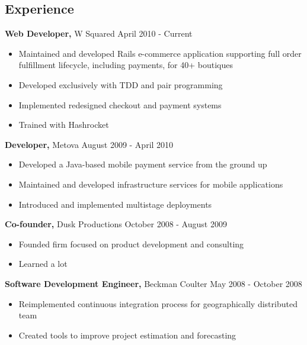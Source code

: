 \documentclass[line, margin, 10pt]{res}
\begin{document}
 

\renewcommand{\namefont}{ \LARGE \bf }

\address{elizabrock@gmail.com}
\address{(858) 205-9285}
 
\begin{resume} 
\section{Experience}
 {\bf Web Developer,} W Squared \hfill April 2010 - Current
 \begin{itemize} \itemsep -2pt  %
 \item Maintained and developed Rails e-commerce application supporting full order fulfillment lifecycle, including payments, for 40+ boutiques
 \item Developed exclusively with TDD and pair programming
 \item Implemented redesigned checkout and payment systems
 \item Trained with Hashrocket
 \end{itemize}

 {\bf Developer,} Metova  \hfill August 2009 - April 2010
 \begin{itemize} \itemsep -2pt  %
 \item Developed a Java-based mobile payment service from the ground up
 \item Maintained and developed infrastructure services for mobile applications
 \item Introduced and implemented multistage deployments
 \end{itemize}

{\bf Co-founder,} Dusk Productions  \hfill  October 2008 - August 2009 
\begin{itemize} \itemsep -2pt %
\item Founded firm focused on product development and consulting
\item Learned a lot
\end{itemize}

{\bf Software Development Engineer,} Beckman Coulter \hfill May 2008 - October 2008
\begin{itemize} \itemsep -2pt %
\item Reimplemented continuous integration process for geographically distributed team
\item Created tools to improve project estimation and forecasting
\end{itemize}


\end{resume}
\end{document}

